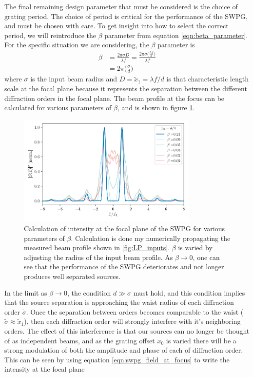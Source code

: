The final remaining design parameter that must be considered is the choice of grating period. The choice of period is critical for the performance of the SWPG, and must be chosen with care.  To get insight into how to select the correct period, we will reintroduce the $\beta$ parameter from equation \ref{eqn:beta_parameter}.  For the specific situation we are considering, the $\beta$ parameter is
\begin{equation}
\label{eqn:beta_swpg}
	\begin{aligned}
		\beta &= \frac{2\pi \sigma D}{\lambda f} = \frac{2\pi\sigma\big(\frac{\lambda f}{d}\big)}{\lambda f}\\
		&= 2\pi\bigg(\frac{\sigma}{d}\bigg)
	\end{aligned}
\end{equation}
where $\sigma$ is the input beam radius and $D=\tilde{x}_1=\lambda f /d$ is that characteristic length scale at the focal plane because it represents the separation between the different diffraction orders in the focal plane.  The beam profile at the focus can be calculated for various parameters of $\beta$, and is shown in figure \ref{fig:intensity_vs_beta}.
\begin{figure}
	\centering
	\includegraphics[width=0.8\textwidth]{figures/Two_source/focus_intensity_beta_sigma.pdf}
	\caption{Calculation of intensity at the focal plane of the SWPG for various parameters of $\beta$.  Calculation is done my numerically propagating the measured beam profile shown in \ref{fig:LP_inputs}.  $\beta$ is varied by adjusting the radius of the input beam profile.  As $\beta\rightarrow0$, one can see that the performance of the SWPG deteriorates and not longer produces well separated sources.}
	\label{fig:intensity_vs_beta}
\end{figure}
In the limit as $\beta\rightarrow0$, the condition $d\gg\sigma$ must hold, and this condition implies that the source separation is approaching the waist radius of each diffraction order $\tilde{\sigma}$.  Once the separation between orders becomes comparable to the waist ($\tilde{\sigma}\approx\tilde{x}_1$), then each diffraction order will strongly interfere with it's neighboring orders.  The effect of this interference is that our sources can no longer be thought of as independent beams, and as the grating offset $x_0$ is varied there will be a strong modulation of both the amplitude and phase of each of diffraction order.  This can be seen by using equation \ref{eqn:swpg_field_at_focus} to write the intensity at the focal plane
